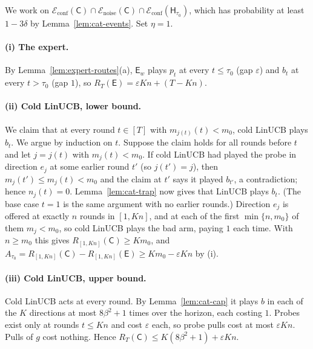 \documentclass[anon]{alt2027} %
\newcommand{\eps}{\varepsilon}
\newcommand{\Cold}{\mathsf{C}}
\newcommand{\Exp}{\mathsf{E}}
\newcommand{\Hyb}{\mathsf{H}}
\begin{document}
We work on $\mathcal E_{\mathrm{conf}}(\Cold)\cap\mathcal E_{\mathrm{noise}}(\Cold)\cap\mathcal E_{\mathrm{conf}}(\Hyb_{\tau_0})$,
which has probability at least $1-3\delta$ by Lemma~\ref{lem:cat-events}. Set
$\eta=1$.

\paragraph{(i) The expert.}
By Lemma~\ref{lem:expert-routes}(a), $\Exp_w$ plays $p_t$ at every $t\le\tau_0$
(gap $\eps$) and $b_t$ at every $t>\tau_0$ (gap $1$), so $R_T(\Exp)=\eps Kn+(T-Kn)$.

\paragraph{(ii) Cold LinUCB, lower bound.}
We claim that at every round $t\in[T]$ with $m_{j(t)}(t)<m_0$, cold LinUCB
plays $b_t$. We argue by induction on $t$. Suppose the claim holds for all
rounds before $t$ and let $j=j(t)$ with $m_j(t)<m_0$. If cold LinUCB had
played the probe in direction $e_j$ at some earlier round $t'$ (so $j(t')=j$),
then $m_j(t')\le m_j(t)<m_0$ and the claim at $t'$ says it played $b_{t'}$,
a contradiction; hence $n_j(t)=0$. Lemma~\ref{lem:cat-trap} now gives that
LinUCB plays $b_t$. (The base case $t=1$ is the same argument with no earlier
rounds.) Direction $e_j$ is offered at exactly $n$ rounds in $[1,Kn]$, and at
each of the first $\min\{n,m_0\}$ of them $m_j<m_0$, so cold LinUCB plays the
bad arm, paying $1$ each time. With $n\ge m_0$ this gives $R_{[1,Kn]}(\Cold)\ge Km_0$,
and $A_{\tau_0}=R_{[1,Kn]}(\Cold)-R_{[1,Kn]}(\Exp)\ge Km_0-\eps Kn$ by (i).

\paragraph{(iii) Cold LinUCB, upper bound.}
Cold LinUCB acts at every round. By Lemma~\ref{lem:cat-cap} it plays $b$ in
each of the $K$ directions at most $8\beta^2+1$ times over the horizon, each
costing $1$. Probes exist only at rounds $t\le Kn$ and cost $\eps$ each, so
probe pulls cost at most $\eps Kn$. Pulls of $g$ cost nothing. Hence
$R_T(\Cold)\le K(8\beta^2+1)+\eps Kn$.
\end{document}
